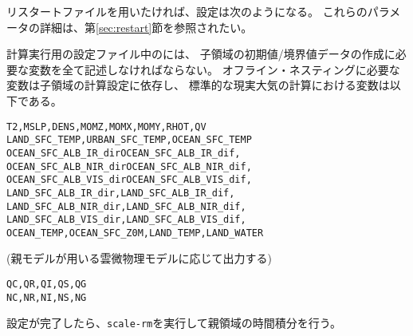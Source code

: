 リスタートファイルを用いたければ、設定は次のようになる。
これらのパラメータの詳細は、第\ref{sec:restart}節を参照されたい。

計算実行用の設定ファイル中のには、
子領域の初期値/境界値データの作成に必要な変数を全て記述しなければならない。
オフライン・ネスティングに必要な変数は子領域の計算設定に依存し、
標準的な現実大気の計算における変数は以下である。
\begin{alltt}
  T2, MSLP, DENS, MOMZ, MOMX, MOMY, RHOT, QV
  LAND_SFC_TEMP, URBAN_SFC_TEMP, OCEAN_SFC_TEMP
  OCEAN_SFC_ALB_IR_dir OCEAN_SFC_ALB_IR_dif,
  OCEAN_SFC_ALB_NIR_dir OCEAN_SFC_ALB_NIR_dif,
  OCEAN_SFC_ALB_VIS_dir OCEAN_SFC_ALB_VIS_dif,
  LAND_SFC_ALB_IR_dir, LAND_SFC_ALB_IR_dif,
  LAND_SFC_ALB_NIR_dir, LAND_SFC_ALB_NIR_dif,
  LAND_SFC_ALB_VIS_dir, LAND_SFC_ALB_VIS_dif,
  OCEAN_TEMP, OCEAN_SFC_Z0M, LAND_TEMP, LAND_WATER
\end{alltt}
(親モデルが用いる雲微物理モデルに応じて出力する)
\begin{alltt}
  QC, QR, QI, QS, QG
  NC, NR, NI, NS, NG
\end{alltt}
設定が完了したら、\verb|scale-rm|を実行して親領域の時間積分を行う。

